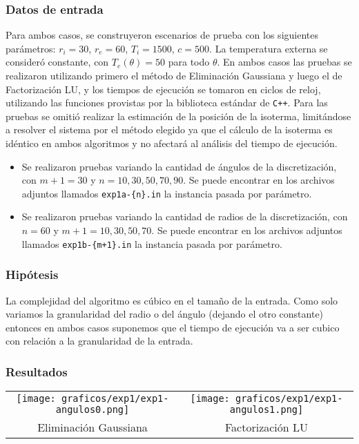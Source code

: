       \subsubsection*{Datos de entrada}
        Para ambos casos, se construyeron escenarios de prueba con los siguientes parámetros: $r_i = 30$, $r_e = 60$, $T_i = 1500$, $c = 500$. La temperatura externa se consideró constante, con $T_e(\theta) = 50$ para todo $\theta$. En ambos casos las pruebas se realizaron utilizando primero el método de Eliminación Gaussiana y luego el de Factorización LU, y los tiempos de ejecución se tomaron en ciclos de reloj, utilizando las funciones provistas por la biblioteca estándar de \texttt{C++}. Para las pruebas se omitió realizar la estimación de la posición de la isoterma, limitándose a resolver el sistema por el método elegido ya que el cálculo de la isoterma es idéntico en ambos algoritmos y no afectará al análisis del tiempo de ejecución. 
      
        \begin{itemize}
          \item {} Se realizaron pruebas variando la cantidad de ángulos de la discretización, con $m + 1 = 30$ y $n = 10, 30, 50, 70, 90$. Se puede encontrar en los archivos adjuntos llamados \texttt{exp1a-\{n\}.in} la instancia pasada por parámetro.

          \item {} Se realizaron pruebas variando la cantidad de radios de la discretización, con $n = 60$ y $m+1 = 10, 30, 50, 70$. Se puede encontrar en los archivos adjuntos llamados \texttt{exp1b-\{m+1\}.in} la instancia pasada por parámetro.
        \end{itemize}

      \subsubsection*{Hipótesis}
        La complejidad del algoritmo es cúbico en el tamaño de la entrada. Como solo variamos la granularidad del radio o del ángulo (dejando el otro constante) entonces en ambos casos suponemos que el tiempo de ejecución va a ser cubico con relación a la granularidad de la entrada.

      \subsubsection*{Resultados}
       
        \begin{minipage}{\textwidth}
          \begin{center}

            \begin{tabular}{cc}
              \texttt{[image: graficos/exp1/exp1-angulos0.png]} & \texttt{[image: graficos/exp1/exp1-angulos1.png]} \\
              {\small Eliminación Gaussiana} & {\small Factorización LU} \\
            \end{tabular}
          \end{center}
        \end{minipage}

